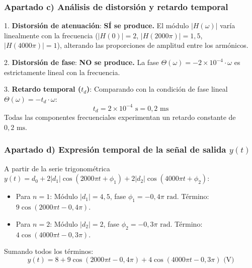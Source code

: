 \begin{resolucion}
\subsubsection*{Apartado c) Análisis de distorsión y retardo temporal}

1. \textbf{Distorsión de atenuación}: \textbf{SÍ se produce.} El módulo $|H(\omega)|$ varía linealmente con la frecuencia ($|H(0)| = 2$, $|H(2000\pi)| = 1{,}5$, $|H(4000\pi)| = 1$), alterando las proporciones de amplitud entre los armónicos.

2. \textbf{Distorsión de fase}: \textbf{NO se produce.} La fase $\Theta(\omega) = -2\times 10^{-4} \cdot \omega$ es estrictamente lineal con la frecuencia.

3. \textbf{Retardo temporal ($t_d$)}:
   Comparando con la condición de fase lineal $\Theta(\omega) = -t_d \cdot \omega$:
   \[
   t_d = 2\times 10^{-4}\text{ s} = 0{,}2\text{ ms}
   \]
   Todas las componentes frecuenciales experimentan un retardo constante de $0{,}2\text{ ms}$.

\subsubsection*{Apartado d) Expresión temporal de la señal de salida $y(t)$}

A partir de la serie trigonométrica $y(t) = d_0 + 2 |d_1| \cos(2000\pi t + \phi_1) + 2 |d_2| \cos(4000\pi t + \phi_2)$:
\begin{itemize}
    \item Para $n=1$: Módulo $|d_1| = 4{,}5$, fase $\phi_1 = -0{,}4\pi\text{ rad}$. Término: $9 \cos(2000\pi t - 0{,}4\pi)$.
    \item Para $n=2$: Módulo $|d_2| = 2$, fase $\phi_2 = -0{,}3\pi\text{ rad}$. Término: $4 \cos(4000\pi t - 0{,}3\pi)$.
\end{itemize}

Sumando todos los términos:
\[
y(t) = 8 + 9 \cos(2000\pi t - 0{,}4\pi) + 4 \cos(4000\pi t - 0{,}3\pi)\text{ (V)}
\]
\end{resolucion}